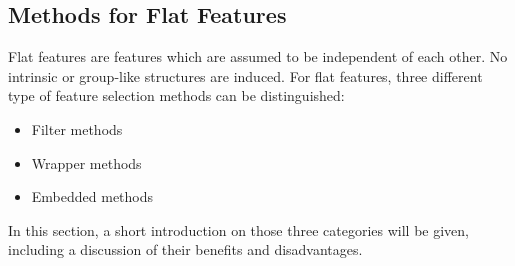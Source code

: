 \subsection{Methods for Flat Features}
\label{sec:methods.flat}


Flat features are features which are assumed to be independent of each other. 
No intrinsic or group-like structures are induced. 
For flat features, three different type of feature selection methods can be distinguished: 
\begin{itemize}
  \item Filter methods
  \item Wrapper methods
  \item Embedded methods
\end{itemize}
In this section, a short introduction on those three categories will be given, 
including a discussion of their benefits and disadvantages.



